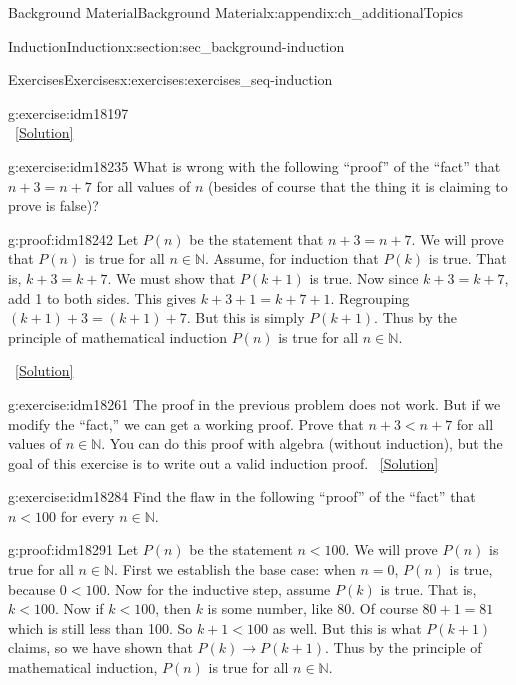 \documentclass[oneside,10pt,]{book}
\numberwithin{equation}{chapter}
\def\N{\mathbb N}
\def\imp{\rightarrow}
\newcommand{\lt}{<}
\begin{document}
\begin{appendixptx}{Background Material}{}{Background Material}{}{}{x:appendix:ch_additionalTopics}
\begin{sectionptx}{Induction}{}{Induction}{}{}{x:section:sec_background-induction}
\begin{exercises-subsection}{Exercises}{}{Exercises}{}{}{x:exercises:exercises_seq-induction}
\begin{divisionexercise}{9}{}{}{g:exercise:idm18197}
\begin{equation*}
\end{equation*}
%
\qquad~\hfill{\tiny\hyperlink{g:solution:idm18202-main}{[Solution]}}\end{divisionexercise}%
\begin{divisionexercise}{10}{}{}{g:exercise:idm18235}%
What is wrong with the following ``proof'' of the ``fact'' that \(n+3 = n+7\) for all values of \(n\) (besides of course that the thing it is claiming to prove is false)?%
\begin{proofptx}{}{g:proof:idm18242}
Let \(P(n)\) be the statement that \(n + 3 = n + 7\). We will prove that \(P(n)\) is true for all \(n \in \N\). Assume, for induction that \(P(k)\) is true. That is, \(k+3 = k+7\). We must show that \(P(k+1)\) is true. Now since \(k + 3 = k + 7\), add 1 to both sides. This gives \(k + 3 + 1 = k + 7 + 1\). Regrouping \((k+1) + 3 = (k+1) + 7\). But this is simply \(P(k+1)\). Thus by the principle of mathematical induction \(P(n)\) is true for all \(n \in \N\).%
\end{proofptx}
\qquad~\hfill{\tiny\hyperlink{g:solution:idm18257-main}{[Solution]}}\end{divisionexercise}%
\begin{divisionexercise}{11}{}{}{g:exercise:idm18261}%
The proof in the previous problem does not work. But if we modify the ``fact,'' we can get a working proof. Prove that \(n + 3 \lt  n + 7\) for all values of \(n \in \N\). You can do this proof with algebra (without induction), but the goal of this exercise is to write out a valid induction proof.%
\qquad~\hfill{\tiny\hyperlink{g:solution:idm18267-main}{[Solution]}}\end{divisionexercise}%
\begin{divisionexercise}{12}{}{}{g:exercise:idm18284}%
Find the flaw in the following ``proof'' of the ``fact'' that \(n \lt  100\) for every \(n \in \N\).%
\begin{proofptx}{}{g:proof:idm18291}
Let \(P(n)\) be the statement \(n \lt  100\). We will prove \(P(n)\) is true for all \(n \in \N\). First we establish the base case: when \(n = 0\), \(P(n)\) is true, because \(0 \lt  100\). Now for the inductive step, assume \(P(k)\) is true. That is, \(k \lt  100\). Now if \(k \lt  100\), then \(k\) is some number, like 80. Of course \(80+1 = 81\) which is still less than 100. So \(k +1 \lt  100\) as well. But this is what \(P(k+1)\) claims, so we have shown that \(P(k) \imp P(k+1)\). Thus by the principle of mathematical induction, \(P(n)\) is true for all \(n \in \N\).%
\end{proofptx}

\end{divisionexercise}
\end{exercises-subsection}
\end{sectionptx}
\end{appendixptx}
\end{document}
